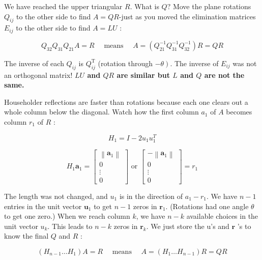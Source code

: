 \begin{example}[使用Givens进行QR分解]
    We have reached the upper triangular $R$. What is $Q ?$ Move the plane rotations $Q_{i j}$ to the other side to find $A=Q R$-just as you moved the elimination matrices $E_{i j}$ to the other side to find $A=L U$ :

    \begin{theorem}
      $$
    Q_{32} Q_{31} Q_{21} A=R \quad \text { means } \quad A=\left(Q_{21}^{-1} Q_{31}^{-1} Q_{32}^{-1}\right) R=Q R
    $$  
    \end{theorem}
    
    The inverse of each $Q_{i j}$ is $Q_{i j}^{\mathrm{T}}$ (rotation through $\left.-\theta\right)$. The inverse of $E_{i j}$ was not an orthogonal matrix! \textbf{$L U$ and $Q R$ are similar but $L$ and $Q$ are not the same.}
\end{example}

Householder reflections are faster than rotations because each one clears out a whole column below the diagonal. Watch how the first column $a_{1}$ of $A$ becomes column $r_{1}$ of $R$ :

\begin{example}[Reflection by $H_1$]
    $$H_1 = I - 2 u_1 u_1^T$$

    $$H_{1} \boldsymbol{a}_{1}=\left[\begin{array}{c}
        \left\|\boldsymbol{a}_{1}\right\| \\
        0 \\
        \vdots \\
        0
        \end{array}\right] \text { or }\left[\begin{array}{c}
        -\left\|\boldsymbol{a}_{1}\right\| \\
        0 \\
        \vdots \\
        0
        \end{array}\right]=r_{1}$$


The length was not changed, and $u_{1}$ is in the direction of $a_{1}-r_{1}$. We have $n-1$ entries in the unit vector $\boldsymbol{u}_{1}$ to get $n-1$ zeros in $\boldsymbol{r}_{1}$. (Rotations had one angle $\theta$ to get one zero.) When we reach column $k$, we have $n-k$ available choices in the unit vector $u_{k}$. This leads to $n-k$ zeros in $\boldsymbol{r}_{k}$. We just store the u's and $\boldsymbol{r}$ 's to know the final $Q$ and $R$ :

\begin{theorem}[$H$的逆是它本身]
    $$
\left(H_{n-1} \ldots H_{1}\right) A=R \quad \text { means }  \quad A=\left(H_{1} \ldots H_{n-1}\right) R=Q R
$$
\end{theorem}

\end{example}


